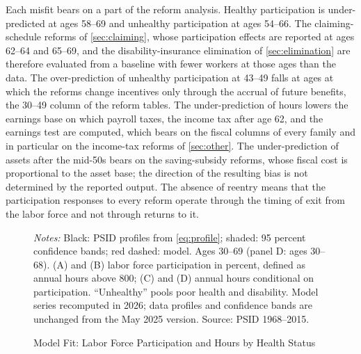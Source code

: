 Each misfit bears on a part of the reform analysis. Healthy participation is under-predicted at ages 58--69 and unhealthy participation at ages 54--66. The claiming-schedule reforms of \autoref{sec:claiming}, whose participation effects are reported at ages 62--64 and 65--69, and the disability-insurance elimination of \autoref{sec:elimination} are therefore evaluated from a baseline with fewer workers at those ages than the data. The over-prediction of unhealthy participation at 43--49 falls at ages at which the reforms change incentives only through the accrual of future benefits, the 30--49 column of the reform tables. %
The under-prediction of hours lowers the earnings base on which payroll taxes, the income tax after age 62, and the earnings test are computed, which bears on the fiscal columns of every family and in particular on the income-tax reforms of \autoref{sec:other}. %
The under-prediction of assets after the mid-50s bears on the saving-subsidy reforms, whose fiscal cost is proportional to the asset base; the direction of the resulting bias is not determined by the reported output. %
The absence of reentry means that the participation responses to every reform operate through the timing of exit from the labor force and not through returns to it. %

\begin{figure}[!tp]
\centering
\caption{Model Fit: Labor Force Participation and Hours by Health Status}
\label{fig:fit}
\vspace{6pt}
\setlength{\tabcolsep}{0pt}%
\begin{minipage}{0.95\textwidth}\footnotesize{}
\textit{Notes:} Black: PSID profiles from \eqref{eq:profile}; shaded: 95 percent confidence bands; red dashed: model. Ages 30--69 (panel D: ages 30--68). (A) and (B) labor force participation in percent, defined as annual hours above 800; (C) and (D) annual hours conditional on participation. ``Unhealthy'' pools poor health and disability. Model series recomputed in 2026; data profiles and confidence bands are unchanged from the May 2025 version. Source: PSID 1968--2015.
\end{minipage}
\end{figure}

